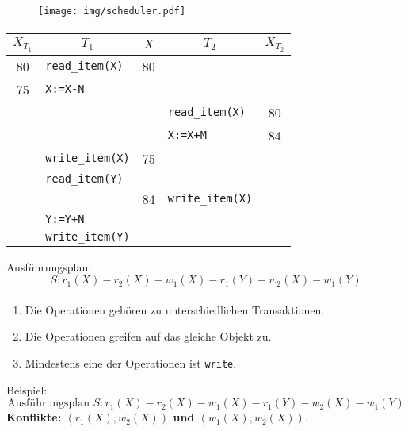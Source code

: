 \begin{frame}{\insertsection}
	\framesubtitle{\insertsubsection}
	\begin{figure}
		\texttt{[image: img/scheduler.pdf]}
	\end{figure}
\end{frame}

\begin{frame}{\insertsection}
	\framesubtitle{\insertsubsection}
\begin{center}
\begin{tabular}{c|p{3.5cm}|c|p{3.5cm}|c}
	$X_{T_1}$ & \multicolumn{1}{c|}{$T_1$} & $X$ & \multicolumn{1}{c|}{$T_2$} & $X_{T_2}$ \\\hline
	80 & \texttt{read\_item(X)} & 80 & &\\
	75 & \texttt{X:=X-N} & & & \\
	& & & \texttt{read\_item(X)} & 80 \\
	& & & \texttt{X:=X+M} & 84\\
	& \texttt{write\_item(X)} & 75 & & \\
	& \texttt{read\_item(Y)} & & & \\
	& & \cellcolor{Red}84 & \texttt{write\_item(X)} & \\
	& \texttt{Y:=Y+N} &  & & \\
	& \texttt{write\_item(Y)} &&&\\
	\end{tabular}
\end{center}
Ausführungsplan: 
$$S: r_1(X) - r_2(X) - w_1(X) - r_1(Y) - w_2(X) - w_1(Y)$$
\end{frame}

\begin{frame}{\insertsection}
\framesubtitle{\insertsubsection}
\begin{definition}
	\begin{enumerate}
		\item Die Operationen gehören zu unterschiedlichen Transaktionen.
		\item Die Operationen greifen auf das gleiche Objekt zu.
		\item Mindestens eine der Operationen ist \texttt{write}.
	\end{enumerate}
\end{definition}
\pause
\abs
Beispiel: 
$$\text{Ausführungsplan }S: r_1(X) - r_2(X) - w_1(X) - r_1(Y) - w_2(X) - w_1(Y)$$
\textbf{Konflikte: $(r_1(X), w_2(X))$ und $(w_1(X), w_2(X))$}.
\end{frame}

